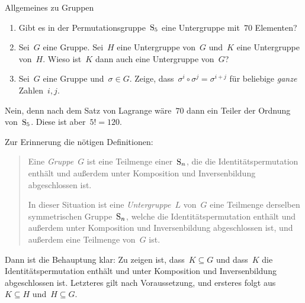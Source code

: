 \documentclass{algblatt}
\begin{document}
\vspace*{-1.5cm}

\begin{aufgabe}{Allgemeines zu Gruppen}
\begin{enumerate}
\item Gibt es in der Permutationsgruppe~$\mathrm{S}_5$ eine Untergruppe mit~$70$
Elementen?

\item Sei~$G$ eine Gruppe. Sei~$H$ eine Untergruppe von~$G$ und~$K$ eine
Untergruppe von~$H$. Wieso ist~$K$ dann auch eine Untergruppe von~$G$?

\item Sei~$G$ eine Gruppe und~$\sigma \in G$. Zeige, dass~$\sigma^i \circ
\sigma^j = \sigma^{i + j}$ für beliebige \emph{ganze} Zahlen~$i,j$.
\end{enumerate}

\begin{loesungE}
\item Nein, denn nach dem Satz von Lagrange wäre~$70$ dann ein Teiler der
Ordnung von~$\mathrm{S}_5$. Diese ist aber~$5! = 120$.

\item Zur Erinnerung die nötigen Definitionen:
\begin{quote}
  Eine \emph{Gruppe}~$G$ ist eine Teilmenge einer~$\mathrm{S}_n$, die die
  Identitätspermutation enthält und außerdem unter
  Komposition und Inversenbildung abgeschlossen ist.

  In dieser Situation ist eine \emph{Untergruppe}~$L$ von~$G$ eine
  Teilmenge derselben symmetrischen Gruppe~$\mathrm{S}_n$, welche die 
  Identitätspermutation enthält und außerdem unter
  Komposition und Inversenbildung abgeschlossen ist, und außerdem eine
  Teilmenge von~$G$ ist.
\end{quote}
Dann ist die Behauptung klar: Zu zeigen ist, dass~$K \subseteq G$ und dass~$K$
die Identitätspermutation enthält und unter Komposition und Inversenbildung
abgeschlossen ist. Letzteres gilt nach Voraussetzung, und ersteres folgt aus~$K
\subseteq H$ und~$H \subseteq G$.
\end{loesungE}
\end{aufgabe}
\end{document}
